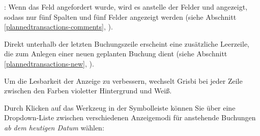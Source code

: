 \begin{itemize}
	\Note{}: Wenn das Feld  angefordert wurde, wird es anstelle der Felder  und  angezeigt, sodass nur fünf Spalten und fünf Felder angezeigt werden (siehe Abschnitt \vref{plannedtransactions-comments}, ).
\end{itemize}

Direkt unterhalb der letzten Buchungszeile erscheint eine zusätzliche Leerzeile, die zum Anlegen einer neuen geplanten Buchung dient (siehe Abschnitt \vref{plannedtransactions-new}, ).

Um die Lesbarkeit der Anzeige zu verbessern, wechselt Grisbi bei jeder Zeile zwischen den Farben \colorbox[RGB]{215,215,255}{violetter Hintergrund} und Weiß.

Durch Klicken auf das Werkzeug \label{plannedtransactions-view} in der Symbolleiste können Sie über eine Dropdown-Liste zwischen verschiedenen Anzeigemodi für anstehende Buchungen \textit{ab dem heutigen Datum} wählen:

